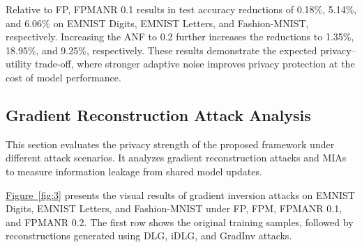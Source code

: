 \documentclass[a4paper,fleqn]{cas-dc}
\newcommand{\xfig}[1]{\hyperref[#1]{Figure~\ref*{#1}}}
\begin{document}
Relative to FP, FPMANR 0.1 results in test accuracy reductions of 0.18\%, 5.14\%, and 6.06\% on EMNIST Digits, EMNIST Letters, and Fashion-MNIST, respectively. Increasing the ANF to 0.2 further increases the reductions to 1.35\%, 18.95\%, and 9.25\%, respectively. These results demonstrate the expected privacy--utility trade-off, where stronger adaptive noise improves privacy protection at the cost of model performance.

\subsection{Gradient Reconstruction Attack Analysis}

This section evaluates the privacy strength of the proposed framework under different attack scenarios. It analyzes gradient reconstruction attacks and MIAs to measure information leakage from shared model updates.

\xfig{fig:3} presents the visual results of gradient inversion attacks on EMNIST Digits, EMNIST Letters, and Fashion-MNIST under FP, FPM, FPMANR 0.1, and FPMANR 0.2. The first row shows the original training samples, followed by reconstructions generated using DLG, iDLG, and GradInv attacks.
\end{document}
